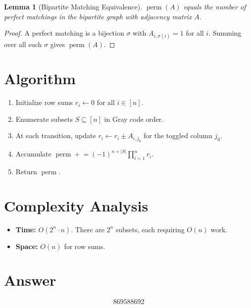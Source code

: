 \documentclass[11pt]{article}
\newtheorem{lemma}[theorem]{Lemma}
\begin{document}
\begin{lemma}[Bipartite Matching Equivalence]
$\operatorname{perm}(A)$ equals the number of perfect matchings in the bipartite graph with adjacency matrix $A$.
\end{lemma}

\begin{proof}
A perfect matching is a bijection $\sigma$ with $A_{i,\sigma(i)}=1$ for all $i$. Summing over all such $\sigma$ gives $\operatorname{perm}(A)$.
\end{proof}

\section{Algorithm}

\begin{enumerate}
\item Initialize row sums $r_i \gets 0$ for all $i \in [n]$.
\item Enumerate subsets $S \subseteq [n]$ in Gray code order.
\item At each transition, update $r_i \gets r_i \pm A_{i,j_0}$ for the toggled column $j_0$.
\item Accumulate $\operatorname{perm} \mathrel{+}= (-1)^{n+|S|}\prod_{i=1}^n r_i$.
\item Return $\operatorname{perm}$.
\end{enumerate}

\section{Complexity Analysis}

\begin{itemize}
\item \textbf{Time:} $O(2^n \cdot n)$. There are $2^n$ subsets, each requiring $O(n)$ work.
\item \textbf{Space:} $O(n)$ for row sums.
\end{itemize}

\section{Answer}

\[
\boxed{869588692}
\]
\end{document}
